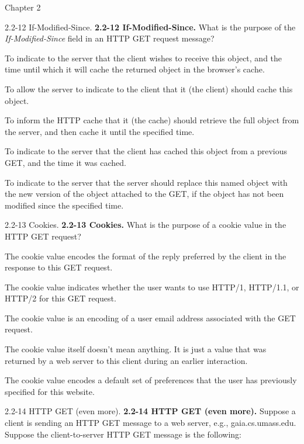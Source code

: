 \documentclass[11pt]{article}
\begin{document}
\begin{quiz}{Chapter 2}
\begin{multi}[points=1,shuffle]{2.2-12 If-Modified-Since.}
\textbf{2.2-12 If-Modified-Since.} 
What is the purpose of the \emph{If-Modified-Since} field in an HTTP GET request message?
\item To indicate to the server that the client wishes to receive this object, and the time until which it will cache the returned object in the browser's cache.
\item To allow the server to indicate to the client that it (the client) should cache this object.
\item To inform the HTTP cache that it (the cache) should retrieve the full object from the server, and then cache it until the specified time.
\item* To indicate to the server that the client has cached this object from a previous GET, and the time it was cached.
\item To indicate to the server that the server should replace this named object with the new version of the object attached to the GET, if the object has not been modified since the specified time.
\end{multi}

\begin{multi}[points=1,shuffle]{2.2-13 Cookies.}
\textbf{2.2-13 Cookies.} What is the purpose of a cookie value in the HTTP GET request?
\item The cookie value encodes the format of the reply preferred by the client in the response to this GET request.
\item The cookie value indicates whether the user wants to use HTTP/1, HTTP/1.1, or HTTP/2 for this GET request.
\item The cookie value is an encoding of a user email address associated with the GET request.
\item* The cookie value itself doesn't mean anything. It is just a value that was returned by a web server to this client during an earlier interaction.
\item The cookie value encodes a default set of preferences that the user has previously specified for this website.
\end{multi}

\begin{multi}[points=1,shuffle]{2.2-14 HTTP GET (even more).}
\textbf{2.2-14 HTTP GET (even more).} 
Suppose a client is sending an HTTP GET message to a web server, e.g., gaia.cs.umass.edu. 
Suppose the client-to-server HTTP GET message is the following: \\


\end{multi}
\end{quiz}
\end{document}
